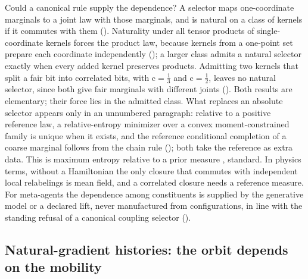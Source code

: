 Could a canonical rule supply the dependence? A selector maps one-coordinate marginals to a joint law
with those marginals, and is natural on a class of kernels if it commutes with them
(). Naturality under all tensor products of single-coordinate
kernels forces the product law, because kernels from a one-point set prepare each coordinate
independently (); a larger class admits a natural
selector exactly when every added kernel preserves products. Admitting two kernels that split a fair
bit into correlated bits, with $\mathrm c=\tfrac13$ and $\mathrm c=\tfrac12$, leaves no natural
selector, since both give fair marginals with different joints
(). Both results are elementary; their force lies in the
admitted class. What replaces an absolute selector appears only in an unnumbered paragraph: relative
to a positive reference law, a relative-entropy minimizer over a convex moment-constrained family is
unique when it exists, and the reference conditional completion of a coarse marginal follows from the
chain rule (); both take the reference as extra data. This is maximum
entropy relative to a prior measure \citep{jaynes2003probability}, standard. In physics terms, without
a Hamiltonian the only closure that commutes with independent local relabelings is mean field, and a
correlated closure needs a reference measure. For meta-agents the dependence among constituents is
supplied by the generative model or a declared lift, never manufactured from configurations, in line
with the standing refusal of a canonical coupling selector ().

\subsection{Natural-gradient histories: the orbit depends on the mobility}
\label{comp:ch07-formulas-orbits}

